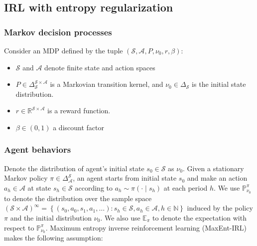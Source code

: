 \subsection{IRL with entropy regularization}\label{sec:IRLentropy}

\subsubsection*{Markov decision processes} 
Consider an MDP defined by the tuple $\left(\mathcal{S}, \mathcal{A}, P, \nu_0, r, \beta\right)$:
\begin{itemize}
    \item $\mathcal{S}$ and $\mathcal{A}$ denote finite state and action spaces
    \item $P \in \Delta_{\mathcal{S}}^{\mathcal{S} \times \mathcal{A}}$ is a Markovian transition kernel, and $\nu_0 \in \Delta_{\mathcal{S}}$ is the initial state distribution. 
    \item $r \in \mathbb{R}^{\mathcal{S} \times \mathcal{A}}$ is a reward function.
    \item $\beta \in(0,1)$ a discount factor
\end{itemize}
\subsubsection{Agent behaviors}

Denote the distribution of agent's initial state $s_0\in \mathcal{S}$ as $\nu_0$. Given a stationary Markov policy $\pi \in \Delta_{\mathcal{A}}^{\mathcal{S}}$, an agent starts from initial state $s_0$ and make an action $a_h\in \mathcal{A}$ at state $s_h\in \mathcal{S}$ according to $a_h\sim\pi\left(\cdot \mid s_h\right)$ at each period $h$. We use $\mathbb{P}_{\nu_0}^\pi$ to denote the distribution over the sample space $(\mathcal{S} \times \mathcal{A})^{\infty}=\left\{\left(s_0, a_0, s_1, a_1, \ldots\right): s_h \in \mathcal{S}, a_h \in \mathcal{A}, h \in \mathbb{N}\right\}$ induced by the policy $\pi$ and the initial distribution $\nu_0$. We also use $\mathbb{E}_\pi$ to denote the expectation with respect to $\mathbb{P}_{\nu_0}^\pi$. Maximum entropy inverse reinforcement learning (MaxEnt-IRL) makes the following assumption: 

